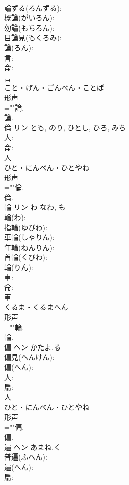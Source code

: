\documentclass[8pt]{extreport}
\begin{document}
\begin{CJK}{UTF8}{min}
\\	論ずる(ろんずる): 
\\	概論(がいろん): 
\\	勿論(もちろん): 
\\	目論見(もくろみ): 
\\	論(ろん): 
\\	言: 
\\	侖: 
\\	言	
\\	こと・げん・ごんべん・ことば	
\\	形声 
\\	=""論.
\\	論.
\\	倫	リン		とも, のり, ひとし, ひろ, みち	
\\	人: 
\\	侖: 
\\	人	
\\	ひと・にんべん・ひとやね	
\\	形声 
\\	=""倫.
\\	倫.
\\	輪	リン	わ	なわ, も	
\\	輪(わ): 
\\	指輪(ゆびわ): 
\\	車輪(しゃりん): 
\\	年輪(ねんりん): 
\\	首輪(くびわ): 
\\	輪(りん): 
\\	車: 
\\	侖: 
\\	車	
\\	くるま・くるまへん	
\\	形声 
\\	=""輪.
\\	輪.
\\	偏	ヘン	かたよ.る		
\\	偏見(へんけん): 
\\	偏(へん): 
\\	人: 
\\	扁: 
\\	人	
\\	ひと・にんべん・ひとやね	
\\	形声 
\\	=""偏.
\\	偏.
\\	遍	ヘン	あまね.く		
\\	普遍(ふへん): 
\\	遍(へん): 
\\	扁: 

\end{CJK}
\end{document}
